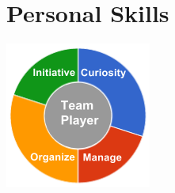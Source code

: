 \documentclass[]{uniqueness_cv}
\begin{document}
\begin{minipage}[t]{0.33\textwidth}
\section{ \textcolor{gray}{} Personal Skills}
\includegraphics[scale=0.80]{img/personal.png}\\
\sectionsep

\end{minipage}
\hfill
\end{document}
